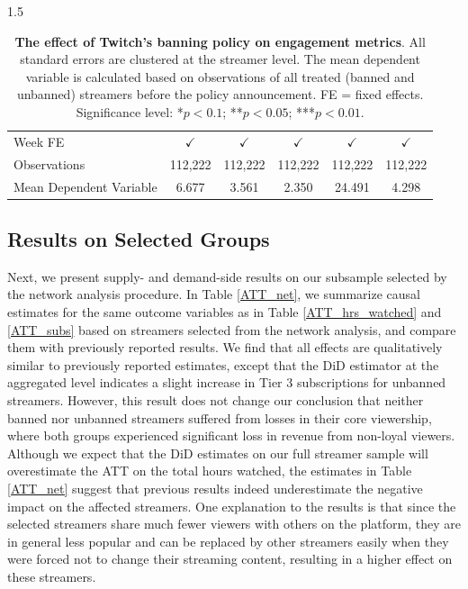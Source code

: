 \documentclass[a4paper,12pt]{article}
\begin{document}
\begin{spacing}{1.5}
\begin{table}[!h]
\begin{threeparttable}
{\begin{tabular}{lccccc}
Week FE      & $\checkmark$ & $\checkmark$ & $\checkmark$ & $\checkmark$ & $\checkmark$ \\
Observations & 112,222 & 112,222 & 112,222 & 112,222 & 112,222 \\
Mean Dependent Variable & 6.677 & 3.561 & 2.350 & 24.491 & 4.298 \\ 
\hline 
\end{tabular}%
}
\end{threeparttable}
\caption{\textbf{The effect of Twitch's banning policy on engagement metrics}. All standard errors are clustered at the streamer level. The mean dependent variable is calculated based on observations of all treated (banned and unbanned) streamers before the policy announcement. FE = fixed effects. Significance level: *$p<0.1$; **$p<0.05$; ***$p<0.01$.}
\label{ATT_engagement}
\end{table}

\subsection{Results on Selected Groups}

Next, we present supply- and demand-side results on our subsample selected by the network analysis procedure. In Table \ref{ATT_net}, we summarize causal estimates for the same outcome variables as in Table \ref{ATT_hrs_watched} and \ref{ATT_subs} based on streamers selected from the network analysis, and compare them with previously reported results. We find that all effects are qualitatively similar to previously reported estimates, except that the DiD estimator at the aggregated level indicates a slight increase in Tier 3 subscriptions for unbanned streamers. However, this result does not change our conclusion that neither banned nor unbanned streamers suffered from losses in their core viewership, where both groups experienced significant loss in revenue from non-loyal viewers. Although we expect that the DiD estimates on our full streamer sample will overestimate the ATT on the total hours watched, the estimates in Table \ref{ATT_net} suggest that previous results indeed underestimate the negative impact on the affected streamers. One explanation to the results is that since the selected streamers share much fewer viewers with others on the platform, they are in general less popular and can be replaced by other streamers easily when they were forced not to change their streaming content, resulting in a higher effect on these streamers.


\end{spacing}
\end{document}
